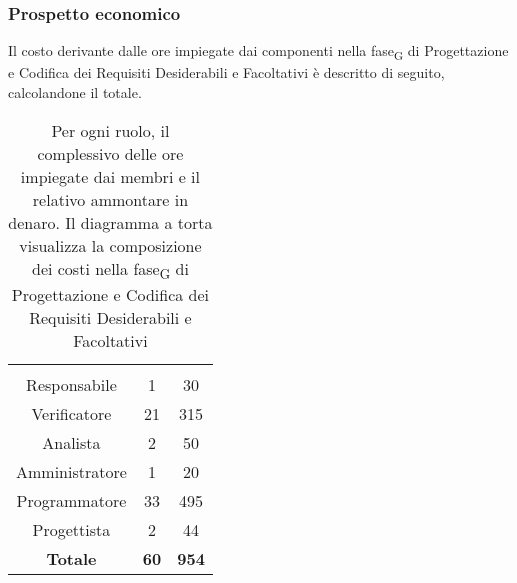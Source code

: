 \subsubsection{Prospetto economico}
Il costo derivante dalle ore impiegate dai componenti nella \gls{fase}\textsubscript{G} di Progettazione e Codifica dei Requisiti Desiderabili e Facoltativi è descritto di seguito, calcolandone il totale.

\begin{table}[H]
	{\setlength{\parindent}{0cm}
		\begin{minipage}{.43\textwidth}
			\begin{tabular}{ccc}
				\rowcolorhead
				\headertitle{Ruolo} & \headertitle{Ore} & \headertitle{Costo(\euro{})}\\
				Responsabile & 1 & 30\\
				Verificatore & 21 & 315\\
				Analista & 2 & 50\\
				Amministratore & 1 & 20\\
				Programmatore & 33 & 495\\
				Progettista & 2 & 44\\
				\hline
				\textbf{Totale} & \textbf{60} & \textbf{954}\\
			\end{tabular}
		\end{minipage}%
		\begin{minipage}{.57\textwidth}
	\end{minipage} }
	\caption[Prospetto economico della \gls{fase}\textsubscript{G} di Progettazione e Codifica dei Requisiti Desiderabili e Facoltativi]{Per ogni ruolo, il complessivo delle ore impiegate dai membri e il relativo ammontare in denaro. Il diagramma a torta visualizza la composizione dei costi nella \gls{fase}\textsubscript{G} di Progettazione e Codifica dei Requisiti Desiderabili e Facoltativi}
\end{table}







